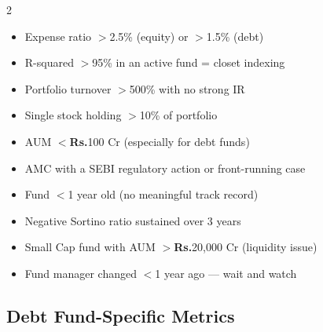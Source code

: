 \documentclass[11pt,a4paper]{article}
\newcommand{\rupee}{\textbf{\textsf{Rs.}}}
\begin{document}
\vspace{5pt}
\begin{warnbox}[title=\ding{47}\ Red Flags --- Avoid Funds With These]
\begin{multicols}{2}
\begin{itemize}
  \item Expense ratio $>$2.5\% (equity) or $>$1.5\% (debt)
  \item R-squared $>$95\% in an active fund = closet indexing
  \item Portfolio turnover $>$500\% with no strong IR
  \item Single stock holding $>$10\% of portfolio
  \item AUM $<$\rupee{}100 Cr (especially for debt funds)
\end{itemize}
\columnbreak
\begin{itemize}
  \item AMC with a SEBI regulatory action or front-running case
  \item Fund $<$1 year old (no meaningful track record)
  \item Negative Sortino ratio sustained over 3 years
  \item Small Cap fund with AUM $>$\rupee{}20,000 Cr (liquidity issue)
  \item Fund manager changed $<$1 year ago --- wait and watch
\end{itemize}
\end{multicols}
\end{warnbox}

\subsection{Debt Fund-Specific Metrics}
\end{document}
